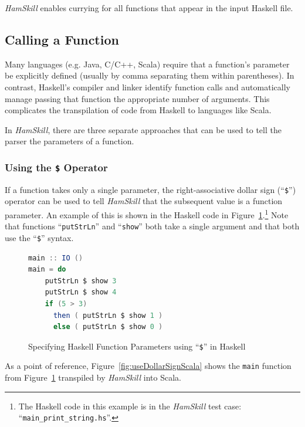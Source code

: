 \documentclass{report}
\begin{document}
\textit{HamSkill} enables currying for all functions that appear in the input Haskell file.

\subsection{Calling a Function}\label{sec:callingAFunction}

Many languages (e.g. Java, C/C++, Scala) require that a function's parameter be explicitly defined (usually by comma separating them within parentheses).  In contrast, Haskell's compiler and linker identify function calls and automatically manage passing that function the appropriate number of arguments.  This complicates the transpilation of code from Haskell to languages like Scala.

In \textit{HamSkill}, there are three separate approaches that can be used to tell the parser the parameters of a function.

\subsubsection{Using the \texttt{\$} Operator}

If a function takes only a single parameter, the right-associative dollar sign (``\texttt{\$}'') operator can be used to tell \textit{HamSkill} that the subsequent value is a function parameter.  An example of this is shown in the Haskell code in Figure~\ref{fig:useDollarSignHaskell}.\footnote{The Haskell code in this example is in the \textit{HamSkill} test case: ``\texttt{main\_print\_string.hs}''.}  Note that functions ``\texttt{putStrLn}'' and ``\texttt{show}'' both take a single argument and that both use the ``\texttt{\$}'' syntax.

\begin{figure}[H]
\begin{mdframed}
\begin{lstlisting}[basicstyle=\small, language=scala]
main :: IO ()
main = do
    putStrLn $ show 3 
    putStrLn $ show 4
    if (5 > 3) 
      then ( putStrLn $ show 1 ) 
      else ( putStrLn $ show 0 )
\end{lstlisting}
\end{mdframed}
\caption{Specifying Haskell Function Parameters using ``\texttt{\$}'' in Haskell}\label{fig:useDollarSignHaskell}
\end{figure}

As a point of reference, Figure~\ref{fig:useDollarSignScala} shows the \texttt{main} function from Figure~\ref{fig:useDollarSignHaskell} transpiled by \textit{HamSkill} into Scala.
\end{document}
